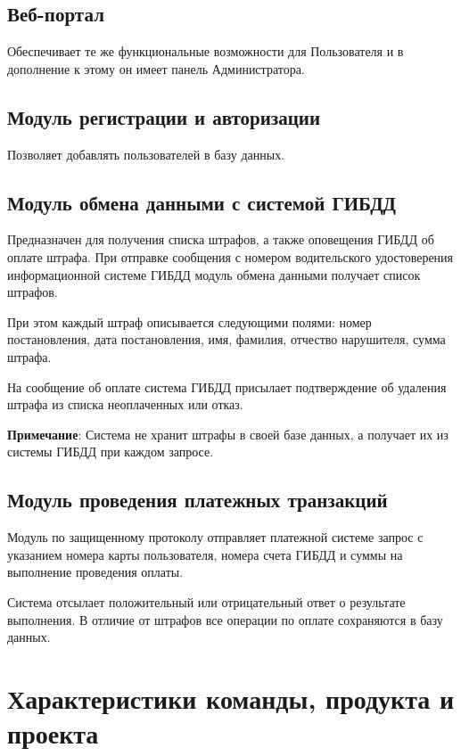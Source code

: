 \subsection{Веб-портал}

Обеспечивает те же функциональные возможности для Пользователя и в дополнение к этому он имеет панель Администратора. 

\subsection{Модуль регистрации и авторизации}

Позволяет добавлять пользователей в
базу данных.

\subsection{Модуль обмена данными с системой ГИБДД}

Предназначен для получения списка штрафов, а также оповещения ГИБДД об оплате штрафа. При отправке сообщения с номером водительского удостоверения информационной системе ГИБДД модуль обмена данными получает список
штрафов. 

При этом каждый штраф описывается следующими полями: номер постановления, дата постановления, имя, фамилия, отчество нарушителя, сумма штрафа. 

На сообщение об оплате система ГИБДД присылает подтверждение об удаления штрафа из списка неоплаченных или отказ.

\textbf{Примечание}: Система не хранит штрафы в своей базе данных, а получает их из системы ГИБДД при каждом запросе.

\subsection{Модуль проведения платежных транзакций}

Модуль по защищенному протоколу отправляет платежной системе запрос с указанием номера карты пользователя, номера счета ГИБДД и суммы на выполнение проведения оплаты. 

Система отсылает положительный или отрицательный ответ о результате выполнения. В отличие от штрафов все операции по оплате сохраняются в базу данных.

\section{Характеристики команды, продукта и проекта}

